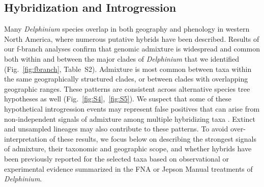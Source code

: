 \documentclass[11pt]{article}
\begin{document}

\subsection{Hybridization and Introgression}
Many \emph{Delphinium} species overlap in both geography and phenology in 
western North America, where numerous putative hybrids have been described.
% 
Results of our f-branch analyses confirm that genomic admixture is widespread
and common both within and between the major clades of \emph{Delphinium} that
we identified (Fig.~\ref{fig:fbranch}, Table~S2).
% 
% 
Admixture is most common between taxa within the same geographically structured
clades, or between clades with overlapping geographic ranges.
% 
These patterns are consistent across alternative species tree hypotheses as well 
(Fig.~\ref{fig:S4},~\ref{fig:S5}).
% 
We suspect that some of these hypothetical introgression events may
represent false positives that can arise from non-independent signals of
admixture among multiple hybridizing taxa \citep{eaton_historical_2015, malinsky_dsuite_2021}.
Extinct and unsampled lineages may also contribute to these patterns.
% 
To avoid over-interpretation of these results, we focus below on describing 
the strongest signals of admixture, their taxonomic and geographic scope, 
and whether hybrids have been previously reported for the selected taxa 
based on observational or experimental evidence summarized in the FNA or 
Jepson Manual treatments of \emph{Delphinium}.
\end{document}
